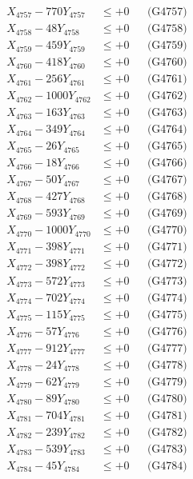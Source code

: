 \documentclass[a4paper,10pt]{article}
\begin{document}
{\begin{align}
X_{4757} - 770Y_{4757} &\leq +0 && \text{(G4757)} \\
X_{4758} - 48Y_{4758} &\leq +0 && \text{(G4758)} \\
X_{4759} - 459Y_{4759} &\leq +0 && \text{(G4759)} \\
X_{4760} - 418Y_{4760} &\leq +0 && \text{(G4760)} \\
\allowbreak
X_{4761} - 256Y_{4761} &\leq +0 && \text{(G4761)} \\
X_{4762} - 1000Y_{4762} &\leq +0 && \text{(G4762)} \\
X_{4763} - 163Y_{4763} &\leq +0 && \text{(G4763)} \\
X_{4764} - 349Y_{4764} &\leq +0 && \text{(G4764)} \\
X_{4765} - 26Y_{4765} &\leq +0 && \text{(G4765)} \\
X_{4766} - 18Y_{4766} &\leq +0 && \text{(G4766)} \\
X_{4767} - 50Y_{4767} &\leq +0 && \text{(G4767)} \\
X_{4768} - 427Y_{4768} &\leq +0 && \text{(G4768)} \\
X_{4769} - 593Y_{4769} &\leq +0 && \text{(G4769)} \\
X_{4770} - 1000Y_{4770} &\leq +0 && \text{(G4770)} \\
\allowbreak
X_{4771} - 398Y_{4771} &\leq +0 && \text{(G4771)} \\
X_{4772} - 398Y_{4772} &\leq +0 && \text{(G4772)} \\
X_{4773} - 572Y_{4773} &\leq +0 && \text{(G4773)} \\
X_{4774} - 702Y_{4774} &\leq +0 && \text{(G4774)} \\
X_{4775} - 115Y_{4775} &\leq +0 && \text{(G4775)} \\
X_{4776} - 57Y_{4776} &\leq +0 && \text{(G4776)} \\
X_{4777} - 912Y_{4777} &\leq +0 && \text{(G4777)} \\
X_{4778} - 24Y_{4778} &\leq +0 && \text{(G4778)} \\
X_{4779} - 62Y_{4779} &\leq +0 && \text{(G4779)} \\
X_{4780} - 89Y_{4780} &\leq +0 && \text{(G4780)} \\
\allowbreak
X_{4781} - 704Y_{4781} &\leq +0 && \text{(G4781)} \\
X_{4782} - 239Y_{4782} &\leq +0 && \text{(G4782)} \\
X_{4783} - 539Y_{4783} &\leq +0 && \text{(G4783)} \\
X_{4784} - 45Y_{4784} &\leq +0 && \text{(G4784)} \\

\end{align}}
\end{document}

